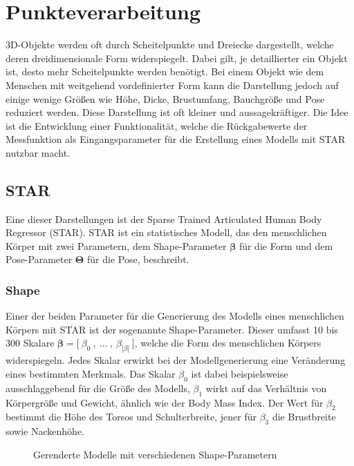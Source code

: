 
\newcommand{\irow}[1]{%
\big[ \  #1 \ \big]%
}

\chapter{Punkteverarbeitung}

3D-Objekte werden oft durch Scheitelpunkte und Dreiecke dargestellt, welche deren dreidimensionale Form widerspiegelt.
Dabei gilt, je detaillierter ein Objekt ist, desto mehr Scheitelpunkte werden benötigt. Bei einem Objekt wie dem
Menschen mit weitgehend vordefinierter Form kann die Darstellung jedoch auf einige wenige Größen wie Höhe,
Dicke, Brustumfang, Bauchgröße und Pose reduziert werden. Diese Darstellung ist oft kleiner und aussagekräftiger.
\cite{Ha2018} Die Idee ist die Entwicklung einer Funktionalität, welche die Rückgabewerte der
Messfunktion als Eingangsparameter für die Erstellung eines Modells mit STAR nutzbar macht.

\section{STAR}

Eine dieser Darstellungen ist der Sparse Trained Articulated Human Body Regressor (STAR). 
STAR ist ein statistisches Modell, das den menschlichen Körper mit zwei Parametern, dem Shape-Parameter $\boldsymbol{\beta}$
für die Form und dem Pose-Parameter $\boldsymbol{\Theta}$ für die Pose, beschreibt.

\subsection{Shape}

Einer der beiden Parameter für die Generierung des Modells eines menschlichen Körpers mit STAR ist der sogenannte Shape-Parameter.
Dieser umfasst 10 bis 300 Skalare \linebreak ${\boldsymbol{\beta}= \irow{\beta _0 \ ,\ \ldots \ , \ \beta_{|\beta|}}}$, welche die
Form des menschlichen Körpers widerspiegeln. Jedes Skalar erwirkt bei der Modellgenerierung eine
Veränderung eines bestimmten Merkmals. Das Skalar $\beta _0$ ist dabei beispielsweise ausschlaggebend
für die Größe des Modells, $\beta _1$ wirkt auf das Verhältnis von Körpergröße und Gewicht, ähnlich wie
der Body Mass Index. Der Wert für $\beta _2$ bestimmt die Höhe des Torsos und Schulterbreite, jener für
$\beta _3$ die Brustbreite sowie Nackenhöhe.
\begin{figure}[H]
  \centering 
   \qquad 
   \qquad 
  \caption{Gerenderte Modelle mit verschiedenen Shape-Parametern} 
  \label{fig:betas}
\end{figure}

